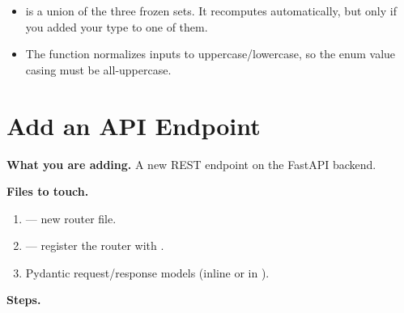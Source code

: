 \begin{itemize}
    \item {} is a union of the three frozen
          sets.  It recomputes automatically, but only if you added your
          type to one of them.
    \item The  function normalizes
          inputs to uppercase/lowercase, so the enum value casing must be
          all-uppercase.
\end{itemize}


\section{Add an API Endpoint}
\label{sec:add-api-endpoint}

\noindent\textbf{What you are adding.}
A new REST endpoint on the FastAPI backend.

\medskip\noindent\textbf{Files to touch.}

\begin{enumerate}
    \item {} --- new
          router file.
    \item {} --- register the router with
          .
    \item Pydantic request/response models (inline or in
          ).
\end{enumerate}

\medskip\noindent\textbf{Steps.}

